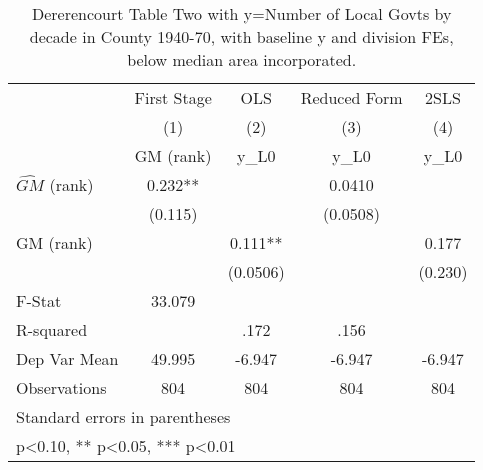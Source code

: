 \begin{table}[htbp]\centering
\def\sym#1{\ifmmode^{#1}\else\(^{#1}\)\fi}
\caption{Dererencourt Table Two with y=Number of Local Govts by decade in County 1940-70, with baseline y and division FEs, below median area incorporated.}
\begin{tabular}{l*{4}{c}}
\toprule
                    & First Stage   &         OLS   &Reduced Form   &        2SLS   \\
                    &\multicolumn{1}{c}{(1)}&\multicolumn{1}{c}{(2)}&\multicolumn{1}{c}{(3)}&\multicolumn{1}{c}{(4)}\\
                    &\multicolumn{1}{c}{GM  (rank)}&\multicolumn{1}{c}{y\_L0}&\multicolumn{1}{c}{y\_L0}&\multicolumn{1}{c}{y\_L0}\\
\midrule
$\hat{GM}$ (rank)   &       0.232** &               &      0.0410   &               \\
                    &     (0.115)   &               &    (0.0508)   &               \\
\addlinespace
GM  (rank)          &               &       0.111** &               &       0.177   \\
                    &               &    (0.0506)   &               &     (0.230)   \\
\midrule
F-Stat              &      33.079   &               &               &               \\
R-squared           &               &        .172   &        .156   &               \\
Dep Var Mean        &      49.995   &      -6.947   &      -6.947   &      -6.947   \\
Observations        &         804   &         804   &         804   &         804   \\
\bottomrule
\multicolumn{5}{l}{\footnotesize Standard errors in parentheses}\\
\multicolumn{5}{l}{\footnotesize * p<0.10, ** p<0.05, *** p<0.01}\\
\end{tabular}
\end{table}
